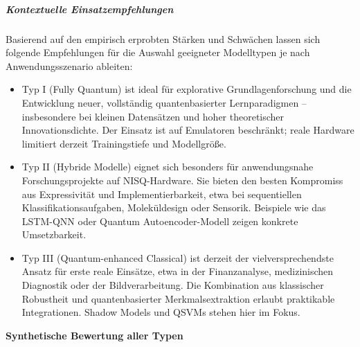\subparagraph{Kontextuelle Einsatzempfehlungen}
Basierend auf den empirisch erprobten Stärken und Schwächen lassen sich folgende Empfehlungen für die Auswahl geeigneter Modelltypen je nach Anwendungsszenario ableiten:
\begin{itemize}
  \item Typ I (Fully Quantum) ist ideal für explorative Grundlagenforschung und die Entwicklung neuer, vollständig quantenbasierter Lernparadigmen – insbesondere bei kleinen Datensätzen und hoher theoretischer Innovationsdichte. Der Einsatz ist auf Emulatoren beschränkt; reale Hardware limitiert derzeit Trainingstiefe und Modellgröße.
  \vspace{0.5em}
  \item Typ II (Hybride Modelle) eignet sich besonders für anwendungsnahe Forschungsprojekte auf NISQ-Hardware. Sie bieten den besten Kompromiss aus Expressivität und Implementierbarkeit, etwa bei sequentiellen Klassifikationsaufgaben, Moleküldesign oder Sensorik. Beispiele wie das LSTM-QNN oder Quantum Autoencoder-Modell zeigen konkrete Umsetzbarkeit.
  \vspace{0.5em}
  \item Typ III (Quantum-enhanced Classical) ist derzeit der vielversprechendste Ansatz für erste reale Einsätze, etwa in der Finanzanalyse, medizinischen Diagnostik oder der Bildverarbeitung. Die Kombination aus klassischer Robustheit und quantenbasierter Merkmalsextraktion erlaubt praktikable Integrationen. Shadow Models und QSVMs stehen hier im Fokus.
\end{itemize}


\vspace{1.5em}
\noindent\textbf{Synthetische Bewertung aller Typen}

